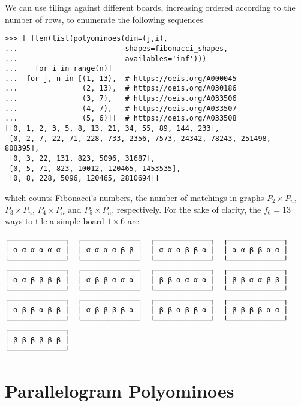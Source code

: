 We can use tilings against different boards, increasing ordered according to the
number of rows, to enumerate the following sequences
\begin{verbatim}
>>> [ [len(list(polyominoes(dim=(j,i),
...                         shapes=fibonacci_shapes,
...                         availables='inf')))
...    for i in range(n)]
...  for j, n in [(1, 13),  # https://oeis.org/A000045
...               (2, 13),  # https://oeis.org/A030186
...               (3, 7),   # https://oeis.org/A033506
...               (4, 7),   # https://oeis.org/A033507
...               (5, 6)]]  # https://oeis.org/A033508
[[0, 1, 2, 3, 5, 8, 13, 21, 34, 55, 89, 144, 233],
 [0, 2, 7, 22, 71, 228, 733, 2356, 7573, 24342, 78243, 251498, 808395],
 [0, 3, 22, 131, 823, 5096, 31687],
 [0, 5, 71, 823, 10012, 120465, 1453535],
 [0, 8, 228, 5096, 120465, 2810694]]
\end{verbatim}
which counts Fibonacci's numbers, the number of matchings in graphs $P_2 \times
P_n$, $P_{3} \times P_{n}$, $P_{4} \times P_{n}$ and $P_{5} \times P_{n}$,
respectively. For the sake of clarity, the $f_{6} = 13$ ways to tile a 
simple board $1\times 6$ are:
\begin{Verbatim}[baselinestretch=0.1, fontsize=\small]
┌─────────────┐  ┌─────────────┐  ┌─────────────┐  ┌─────────────┐
│ α α α α α α │  │ α α α α β β │  │ α α α β β α │  │ α α β β α α │
└─────────────┘  └─────────────┘  └─────────────┘  └─────────────┘
┌─────────────┐  ┌─────────────┐  ┌─────────────┐  ┌─────────────┐
│ α α β β β β │  │ α β β α α α │  │ β β α α α α │  │ β β α α β β │
└─────────────┘  └─────────────┘  └─────────────┘  └─────────────┘
┌─────────────┐  ┌─────────────┐  ┌─────────────┐  ┌─────────────┐
│ α β β α β β │  │ α β β β β α │  │ β β α β β α │  │ β β β β α α │
└─────────────┘  └─────────────┘  └─────────────┘  └─────────────┘
┌─────────────┐
│ β β β β β β │
└─────────────┘
\end{Verbatim}


\section{Parallelogram Polyominoes}

